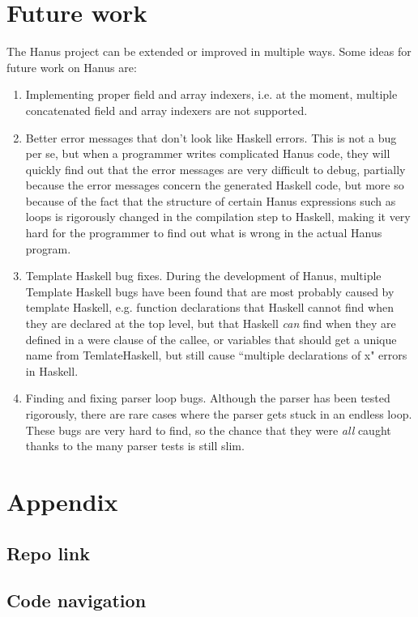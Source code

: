 \documentclass[12pt,a4paper]{article}
\begin{document}
\section{Future work}
	The Hanus project can be extended or improved in multiple ways. Some ideas for future work on Hanus are:
        \begin{enumerate}
                	\item Implementing proper field and array indexers, i.e. at the moment, multiple concatenated field and array indexers are not supported.
                	\item Better error messages that don't look like Haskell errors. This is not a bug per se, but when a programmer writes complicated Hanus code, they will quickly find out that the error messages are very difficult to debug, partially because the error messages concern the generated Haskell code, but more so because of the fact that the structure of certain Hanus expressions such as loops is rigorously changed in the compilation step to Haskell, making it very hard for the programmer to find out what is wrong in the actual Hanus program.
                	\item Template Haskell bug fixes. During the development of Hanus, multiple Template Haskell bugs have been found that are most probably caused by template Haskell, e.g. function declarations that Haskell cannot find when they are declared at the top level, but that Haskell \emph{can} find when they are defined in a were clause of the callee, or variables that should get a unique name from TemlateHaskell, but still cause ``multiple declarations of x" errors in Haskell.
                	\item Finding and fixing parser loop bugs. Although the parser has been tested rigorously, there are rare cases where the parser gets stuck in an endless loop. These bugs are very hard to find, so the chance that they were \emph{all} caught thanks to the many parser tests is still slim.
        \end{enumerate}
\section{Appendix}
	\subsection{Repo link}
	\subsection{Code navigation}

\newpage


\end{document}
